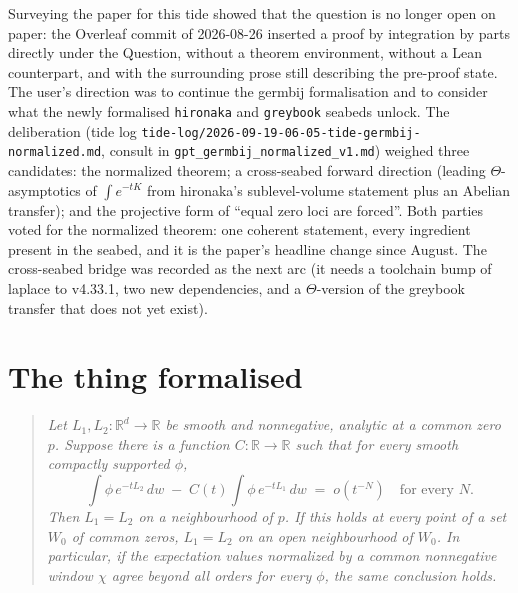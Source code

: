 \documentclass[11pt]{article}
\newcommand{\R}{\mathbb{R}}
\newcommand{\code}[1]{\texttt{#1}}
\begin{document}
Surveying the paper for this tide showed that the question is no
longer open on paper: the Overleaf commit of 2026-08-26 inserted a proof
by integration by parts directly under the Question, without a theorem
environment, without a Lean counterpart, and with the surrounding prose
still describing the pre-proof state. The user's direction was to
continue the germbij formalisation and to consider what the newly
formalised \code{hironaka} and \code{greybook} seabeds unlock. The
deliberation (tide log
\code{tide-log/2026-09-19-06-05-tide-germbij-normalized.md}, consult in
\code{gpt\_germbij\_normalized\_v1.md}) weighed three candidates: the
normalized theorem; a cross-seabed forward direction (leading
$\Theta$-asymptotics of $\int e^{-tK}$ from hironaka's sublevel-volume
statement plus an Abelian transfer); and the projective form of
``equal zero loci are forced''. Both parties voted for the normalized
theorem: one coherent statement, every ingredient present in the seabed,
and it is the paper's headline change since August. The cross-seabed
bridge was recorded as the next arc (it needs a toolchain bump of
laplace to v4.33.1, two new dependencies, and a $\Theta$-version of the
greybook transfer that does not yet exist).

\section{The thing formalised}

\begin{quote}\itshape
Let $L_1, L_2 : \R^d \to \R$ be smooth and nonnegative, analytic at a
common zero $p$. Suppose there is a function $C : \R \to \R$ such that
for every smooth compactly supported $\phi$,
\[
\int \phi\, e^{-tL_2}\, dw \;-\; C(t)\int \phi\, e^{-tL_1}\, dw
\;=\; o(t^{-N}) \quad\text{for every } N .
\]
Then $L_1 = L_2$ on a neighbourhood of $p$. If this holds at every point
of a set $W_0$ of common zeros, $L_1 = L_2$ on an open neighbourhood of
$W_0$. In particular, if the expectation values normalized by a common
nonnegative window $\chi$ agree beyond all orders for every $\phi$, the
same conclusion holds.
\end{quote}
\end{document}
